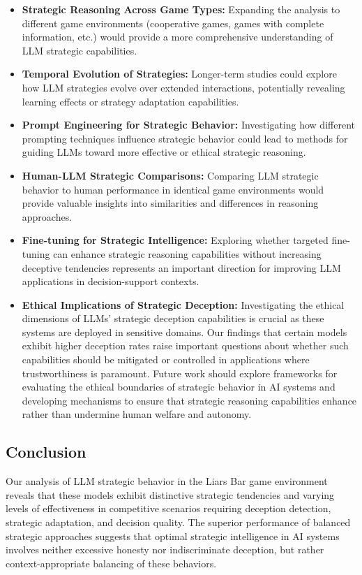 \documentclass{article}
\begin{document}
\begin{itemize}
    \item \textbf{Strategic Reasoning Across Game Types:} Expanding the analysis to different
    game environments (cooperative games, games with complete information, etc.) would provide
    a more comprehensive understanding of LLM strategic capabilities.
    
    \item \textbf{Temporal Evolution of Strategies:} Longer-term studies could explore how LLM
    strategies evolve over extended interactions, potentially revealing learning effects or
    strategy adaptation capabilities.
    
    \item \textbf{Prompt Engineering for Strategic Behavior:} Investigating how different prompting
    techniques influence strategic behavior could lead to methods for guiding LLMs toward more
    effective or ethical strategic reasoning.
    
    \item \textbf{Human-LLM Strategic Comparisons:} Comparing LLM strategic behavior to human
    performance in identical game environments would provide valuable insights into similarities
    and differences in reasoning approaches.
    
    \item \textbf{Fine-tuning for Strategic Intelligence:} Exploring whether targeted fine-tuning
    can enhance strategic reasoning capabilities without increasing deceptive tendencies represents
    an important direction for improving LLM applications in decision-support contexts.
    
    \item \textbf{Ethical Implications of Strategic Deception:} Investigating the ethical dimensions
    of LLMs' strategic deception capabilities is crucial as these systems are deployed in sensitive
    domains. Our findings that certain models exhibit higher deception rates raise important questions
    about whether such capabilities should be mitigated or controlled in applications where
    trustworthiness is paramount. Future work should explore frameworks for evaluating the ethical
    boundaries of strategic behavior in AI systems and developing mechanisms to ensure that strategic
    reasoning capabilities enhance rather than undermine human welfare and autonomy.
\end{itemize}

\subsection{Conclusion}
Our analysis of LLM strategic behavior in the Liars Bar game environment reveals that these models exhibit distinctive strategic tendencies and varying levels of effectiveness in competitive scenarios requiring deception detection, strategic adaptation, and decision quality. The superior performance of balanced strategic approaches suggests that optimal strategic intelligence in AI systems involves neither excessive honesty nor indiscriminate deception, but rather context-appropriate balancing of these behaviors.
\end{document}
